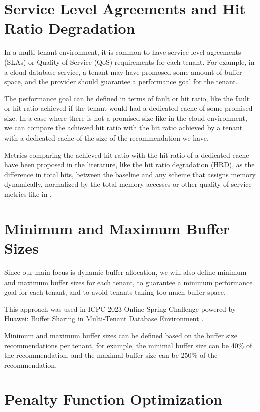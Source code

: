 \section{Service Level Agreements and Hit Ratio Degradation}

In a multi-tenant environment, it is common to have service level agreements (SLAs)
or Quality of Service (QoS) requirements for each tenant. For example, in a cloud 
database service, a tenant may have promosed some amount of buffer space, and the
provider should guarantee a performance goal for the tenant.

The performance goal can be defined in terms of fault or hit ratio, like the fault
or hit ratio achieved if the tenant would had a dedicated cache of some promised size.
In a case where there is not a promised size like in the cloud environment, we can 
compare the achieved hit ratio with the hit ratio achieved by a tenant with a dedicated
cache of the size of the recommendation we have.

Metrics comparing the achieved hit ratio with the hit ratio of a dedicated cache have
been proposed in the literature, like the hit ratio degradation (HRD), as the difference 
in total hits, between the baseline and any scheme that assigns memory dynamically, 
normalized by the total memory accesses \cite{buffer-sharing-1} or other quality of 
service metrics like in \cite{learning-based-prediction}.

\section{Minimum and Maximum Buffer Sizes}

Since our main focus is dynamic buffer allocation, we will also define minimum and maximum 
buffer sizes for each tenant, to guarantee a minimum performance goal for each tenant, and
to avoid tenants taking too much buffer space.

This approach was used in ICPC 2023 Online Spring Challenge powered by Huawei: Buffer Sharing in 
Multi-Tenant Database Environment \cite{huawei-challenge}.

Minimum and maximum buffer sizes can be defined based on the buffer size recommendations per tenant,
for example, the minimal buffer size can be 40\% of the recommendation, and the maximal buffer size
can be 250\% of the recommendation.

\section{Penalty Function Optimization}

